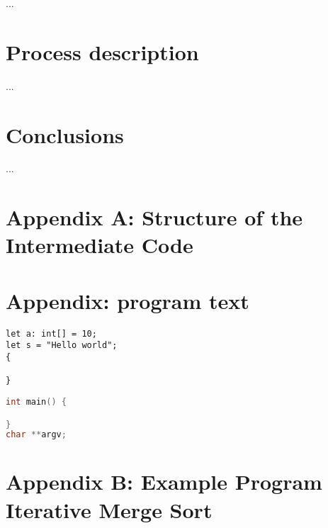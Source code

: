 \documentclass[a4paper]{article}
\begin{document}
...

%

\section{Process description}

...

\section{Conclusions}

...

\section{Appendix A: Structure of the Intermediate Code}
\label{appendix_a}

\section{Appendix: program text}




\begin{lstlisting}[language=DPL]
let a: int[] = 10;
let s = "Hello world";
{

}
\end{lstlisting}

\begin{lstlisting}[language=C]
int main() {

}
char **argv;
\end{lstlisting}


\clearpage
\section{Appendix B: Example Program Iterative Merge Sort}
\label{appendix_b}
\end{document}
